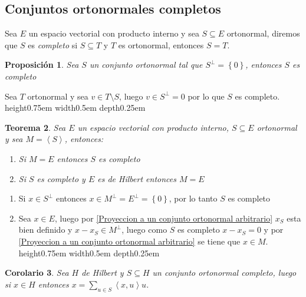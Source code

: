 \documentclass[11pt]{article}
\newcommand{\ip}[1]{\left\langle#1\right\rangle}
\newcommand{\sett}[1]{\left\lbrace#1\right\rbrace}
\newcommand{\Bigsum}[2]{\sum\limits_{#1}{#2}}
\newtheorem{theorem}{Teorema}
\numberwithin{theorem}{subsection}
\newtheorem{proposition}[theorem]{Proposici\'on}
\newtheorem{corollary}[theorem]{Corolario}
\newenvironment{proof}[1][Demostraci\'on]{\begin{trivlist}
		\item[\hskip \labelsep {\bfseries #1}]}{\end{trivlist}}
\newenvironment{definition}[1][Definici\'on]{\begin{trivlist}
		\item[\hskip \labelsep {\bfseries #1}]}{\end{trivlist}}
\newcommand{\qed}{\nobreak \ifvmode \relax \else
	\ifdim\lastskip<1.5em \hskip-\lastskip
	\hskip1.5em plus0em minus0.5em \fi \nobreak
	\vrule height0.75em width0.5em depth0.25em\fi}
\begin{document}
\subsection{Conjuntos ortonormales completos}

\begin{definition}
	Sea $E$ un espacio vectorial con producto interno y sea $S \subseteq E$ ortonormal, diremos que $S$ es \textit{completo} si $S \subseteq T$ y $T$ es ortonormal, entonces $S = T$.
\end{definition}

\begin{proposition}
	\label{Ortogonal vacio es ser completo}
	Sea $S$ un conjunto ortonormal tal que $S^{\perp} = \sett{0}$, entonces $S$ es completo
\end{proposition}

\begin{proof}
	Sea $T$ ortonormal y sea $v \in T \setminus S$, luego $v \in S^{\perp} = 0$ por lo que $S$ es completo. \qed
\end{proof}

\begin{theorem}
	\label{Conjunto ortonormal completo genera en un Hilbert}
	Sea $E$ un espacio vectorial con producto interno, $S \subseteq E$ ortonormal y sea $M = \ip{S}$, entonces:
	
	\begin{enumerate}
		\item Si $M = E$ entonces $S$ es completo
		\item Si $S$ es completo y $E$ es de Hilbert entonces $M = E$
	\end{enumerate}
	
\end{theorem}

\begin{proof}
	\begin{enumerate}
		\item Si $x \in S^{\perp}$ entonces $x \in M^{\perp}=E^{\perp}=\sett{0}$, por lo tanto $S$ es completo
		\item Sea $x \in E$, luego por \ref{Proyeccion a un conjunto ortonormal arbitrario} $x_S$ esta bien definido y $x - x_S \in M^{\perp}$, luego como $S$ es completo $x - x_S = 0$ y por \ref{Proyeccion a un conjunto ortonormal arbitrario} se tiene que $x \in M$. \qed
	\end{enumerate}
\end{proof}

\begin{corollary}
	\label{Escritura de elemento de un HIlbert en un ortonormal completo}
	Sea $H$ de Hilbert y $S \subseteq H$ un conjunto ortonormal completo, luego si $x \in H$ entonces $x = \Bigsum{u \in S}{\ip{x,u}u}$.
\end{corollary}
\end{document}
